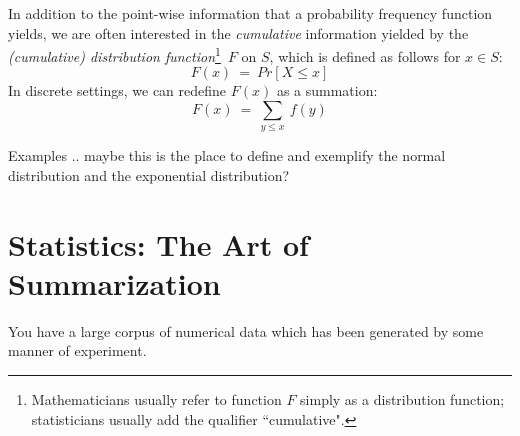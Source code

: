  

In addition to the point-wise information that a probability frequency function yields, we are
often interested in the {\em cumulative} information yielded by the 
{\it (cumulative) distribution function}\footnote{Mathematicians usually refer to function $F$
simply as a distribution function; statisticians usually add the qualifier ``cumulative".}~$F$ 
on $S$, which is defined as follows for $x \in S$:
\[ F(x) \ = \ Pr[X \leq x] \]
In discrete settings, we can redefine $F(x)$ as a summation:
\[ F(x) \ = \ \sum_{y \leq x} \ f(y) \]

{\Arny Examples .. maybe this is the place to define and exemplify the normal distribution
and the exponential distribution?}



\section{Statistics: The Art of Summarization}
\label{sec:statistics}
 
 You have a large corpus of numerical data which has been generated by some manner of
 experiment.
 
\bigskip
 
